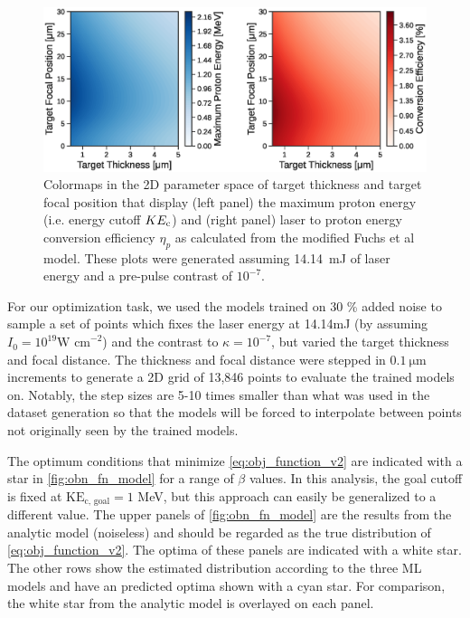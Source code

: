 \begin{figure}
	\centering
	\includegraphics[width=6in]{planning/images/paper2/fig6.eps}
	\caption{Colormaps in the 2D parameter space of target thickness and target focal position that display (left panel) the maximum proton energy (i.e. energy cutoff $KE_{\rm c}$) and (right panel) laser to proton energy conversion efficiency $\eta_{p}$ as calculated from the modified Fuchs et al model. These plots were generated assuming 14.14~mJ of laser energy and a pre-pulse contrast of $10^{-7}$.}
	\label{fig:energy_efficiency}
\end{figure}

For our optimization task, we used the models trained on 30 \% added noise to sample a set of points which fixes the laser energy at 14.14mJ (by assuming $I_0 = 10^{19} \text{W cm}^{-2}$) and the contrast to $\kappa = 10^{-7}$, but varied the target thickness and focal distance. The thickness and focal distance were stepped in $\SI{0.1}{\micro \meter}$ increments to generate a 2D grid of 13,846 points to evaluate the trained models on. Notably, the step sizes are 5-10 times smaller than what was used in the dataset generation so that the models will be forced to interpolate between points not originally seen by the trained models. 

The optimum conditions that minimize \autoref{eq:obj_function_v2} are indicated with a star in \autoref{fig:obn_fn_model} for a range of $\beta$ values. In this analysis, the goal cutoff is fixed at $\text{KE}_\text{c, goal} = 1$ MeV, but this approach can easily be generalized to a different value. The upper panels of \autoref{fig:obn_fn_model} are the results from the analytic model (noiseless) and should be regarded as the true distribution of \autoref{eq:obj_function_v2}. The optima of these panels are indicated with a white star. The other rows show the estimated distribution according to the three \gls{ML} models and have an predicted optima shown with a cyan star. For comparison, the white star from the analytic model is overlayed on each panel.

